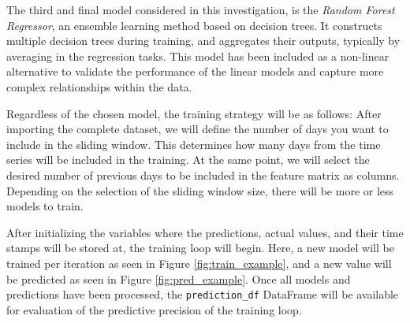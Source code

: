 \documentclass[12pt]{report} %
\begin{document}


The third and final model considered in this investigation, is the \textit{Random Forest Regressor}, an ensemble learning method based on decision trees. It constructs multiple decision trees during training, and aggregates their outputs, typically by averaging in the regression tasks. This model has been included as a non-linear alternative to validate the performance of the linear models and capture more complex relationships within the data.




Regardless of the chosen model, the training strategy will be as follows: After importing the complete dataset, we will define the number of days you want to include in the sliding window. This determines how many days from the time series will be included in the training. At the same point, we will select the desired number of previous days to be included in the feature matrix as columns. Depending on the selection of the sliding window size, there will be more or less models to train.

After initializing the variables where the predictions, actual values, and their time stamps will be stored at, the training loop will begin. Here, a new model will be trained per iteration as seen in Figure \ref{fig:train_example}, and a new value will be predicted as seen in Figure \ref{fig:pred_example}. Once all models and predictions have been processed, the \small{\verb|prediction_df|} DataFrame will be available for evaluation of the predictive precision of the training loop.
\end{document}
